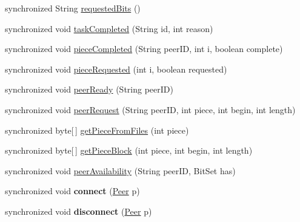 \begin{DoxyCompactItemize}
\item 
synchronized String \hyperlink{classj_bittorrent_a_p_i_1_1_download_manager_a36b75b950fbf07a4e7b7402eb1bd2307}{requestedBits} ()
\item 
synchronized void \hyperlink{classj_bittorrent_a_p_i_1_1_download_manager_a1b52fff0ffb273927c74137371efaa6b}{taskCompleted} (String id, int reason)
\item 
synchronized void \hyperlink{classj_bittorrent_a_p_i_1_1_download_manager_adbcd4f5283d6658ab48a9688c6dba0ca}{pieceCompleted} (String peerID, int i, boolean complete)
\item 
synchronized void \hyperlink{classj_bittorrent_a_p_i_1_1_download_manager_aa2ca48fc9e354d7995b451703780ba7a}{pieceRequested} (int i, boolean requested)
\item 
synchronized void \hyperlink{classj_bittorrent_a_p_i_1_1_download_manager_a5a0a15af5eee295adb93fa5f218bbfc3}{peerReady} (String peerID)
\item 
synchronized void \hyperlink{classj_bittorrent_a_p_i_1_1_download_manager_a0640ab4a739aac77045c288a26118a0c}{peerRequest} (String peerID, int piece, int begin, int length)
\item 
synchronized byte\mbox{[}$\,$\mbox{]} \hyperlink{classj_bittorrent_a_p_i_1_1_download_manager_aafe1b46b577a081aa52db87db81240f7}{getPieceFromFiles} (int piece)
\item 
synchronized byte\mbox{[}$\,$\mbox{]} \hyperlink{classj_bittorrent_a_p_i_1_1_download_manager_ad1e35cf49af550e1a2c47cf6c573a0ec}{getPieceBlock} (int piece, int begin, int length)
\item 
synchronized void \hyperlink{classj_bittorrent_a_p_i_1_1_download_manager_ae8ce95ab44d21aeba95218aab682c21a}{peerAvailability} (String peerID, BitSet has)
\item 
\hypertarget{classj_bittorrent_a_p_i_1_1_download_manager_a554fa1431b5735e733f6fe49e7afa1b9}{
synchronized void {\bfseries connect} (\hyperlink{classj_bittorrent_a_p_i_1_1_peer}{Peer} p)}
\label{classj_bittorrent_a_p_i_1_1_download_manager_a554fa1431b5735e733f6fe49e7afa1b9}

\item 
\hypertarget{classj_bittorrent_a_p_i_1_1_download_manager_ae6474d3735a8b2feccde3d8b4ee2458f}{
synchronized void {\bfseries disconnect} (\hyperlink{classj_bittorrent_a_p_i_1_1_peer}{Peer} p)}
\label{classj_bittorrent_a_p_i_1_1_download_manager_ae6474d3735a8b2feccde3d8b4ee2458f}


\end{DoxyCompactItemize}
